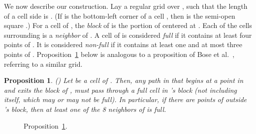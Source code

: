 \documentclass[11pt,letter]{article}
\newtheorem{proposition}[theorem]{Proposition}
\newcommand{\old}[1]{{{}}}
\begin{document}
We now describe our construction.
Lay a regular grid  over , such that the length of a cell side is .
(If  is the bottom-left corner of a cell , then  is the semi-open square .)
For a cell  of , the {\em block} of  is the  portion
of  centered at .
Each of the  cells surrounding  is a {\em neighbor} of .
A cell of  is considered {\em full} if it contains at least four points of .
It is considered {\em non-full} if it contains at least one and at most three points of .
Proposition~\ref{prop:fullcell} below is analogous to a proposition of Bose et al.~\cite{BCDFKM11}, referring to a similar grid.

\begin{proposition}{(\!\!\cite{BCDFKM11})} \label{prop:fullcell}
Let  be a cell of . Then, any path in  that begins at a point in 
and exits the block of , must pass through a full cell in 's block (not including  itself, which may or may not be full).
In particular, if there are points of  outside 's block, then at least one of the 8 neighbors of  is full.
\end{proposition}

\begin{figure}[htp]
   \centering

   \caption{Proposition~\ref{prop:fullcell}.}
   \label{fig:fullcell}
\end{figure}


\old{
\begin{figure}[htp]
   \centering
       \texttt{[image: fig/cell\_size]}
   \caption{Proposition~\ref{prop:fullcell}.}
   \label{fig:fullcell}
\end{figure}
}
\end{document}
